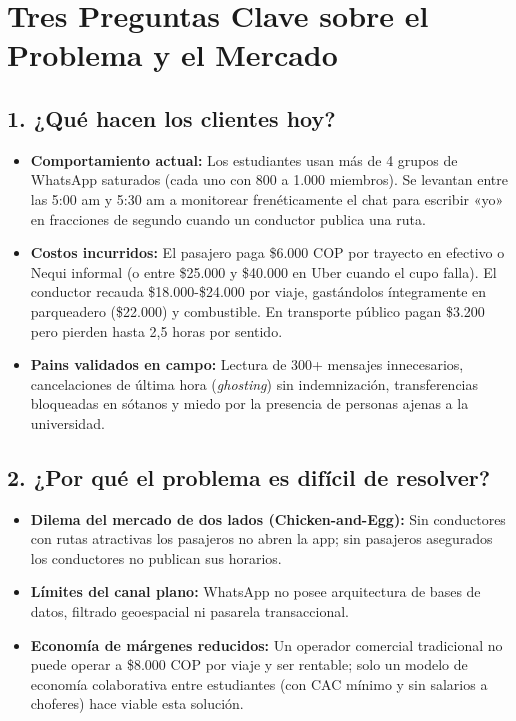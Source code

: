 \documentclass[11pt,a4paper]{article}
\begin{document}
\section{Tres Preguntas Clave sobre el Problema y el Mercado}

\subsection{1. ¿Qué hacen los clientes hoy?}
\begin{itemize}[leftmargin=*]
    \item \textbf{Comportamiento actual:} Los estudiantes usan más de 4 grupos de WhatsApp saturados (cada uno con 800 a 1.000 miembros). Se levantan entre las 5:00 am y 5:30 am a monitorear frenéticamente el chat para escribir «yo» en fracciones de segundo cuando un conductor publica una ruta.
    \item \textbf{Costos incurridos:} El pasajero paga \$6.000 COP por trayecto en efectivo o Nequi informal (o entre \$25.000 y \$40.000 en Uber cuando el cupo falla). El conductor recauda \$18.000-\$24.000 por viaje, gastándolos íntegramente en parqueadero (\$22.000) y combustible. En transporte público pagan \$3.200 pero pierden hasta 2,5 horas por sentido.
    \item \textbf{Pains validados en campo:} Lectura de 300+ mensajes innecesarios, cancelaciones de última hora (\textit{ghosting}) sin indemnización, transferencias bloqueadas en sótanos y miedo por la presencia de personas ajenas a la universidad.
\end{itemize}

\subsection{2. ¿Por qué el problema es difícil de resolver?}
\begin{itemize}[leftmargin=*]
    \item \textbf{Dilema del mercado de dos lados (Chicken-and-Egg):} Sin conductores con rutas atractivas los pasajeros no abren la app; sin pasajeros asegurados los conductores no publican sus horarios.
    \item \textbf{Límites del canal plano:} WhatsApp no posee arquitectura de bases de datos, filtrado geoespacial ni pasarela transaccional.
    \item \textbf{Economía de márgenes reducidos:} Un operador comercial tradicional no puede operar a \$8.000 COP por viaje y ser rentable; solo un modelo de economía colaborativa entre estudiantes (con CAC mínimo y sin salarios a choferes) hace viable esta solución.
\end{itemize}
\end{document}
